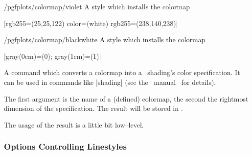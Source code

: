 \begin{stylekey}{/pgfplots/colormap/violet}
	A style which installs the colormap

	|{rgb255=(25,25,122) color=(white) rgb255=(238,140,238)}|

\end{stylekey}

\begin{stylekey}{/pgfplots/colormap/blackwhite}
	A style which installs the colormap

	|{gray(0cm)=(0); gray(1cm)=(1)}|

\end{stylekey}

\begin{command}{\pgfplotscolormaptoshadingspec{}}
	A command which converts a colormap into a \PGF\ shading's color specification. It can be used in commands like |\pgfdeclare*shading| (see the \PGF\ manual~\cite{tikz} for details).

	The first argument is the name of a (defined) colormap, the second the rightmost dimension of the specification. The result will be stored in .
\begin{codeexample}[]
	\result
	\def\tempb{\pgfdeclarehorizontalshading{tempshading}{1cm}}%
	\expandafter\tempb\expandafter{\result}%
\end{codeexample}
The usage of the result  is a little bit low--level.
\end{command}

\subsubsection{Options Controlling Linestyles}

